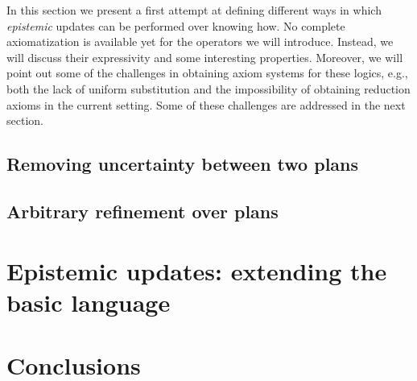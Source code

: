 \documentclass[sn-mathphys-num]{sn-jnl}%
\begin{document}
In this section we present a first attempt at defining different  
ways in which  \emph{epistemic} updates can be performed over knowing how. No complete axiomatization is
available yet for the operators we will introduce.  Instead, we will discuss their expressivity and some interesting properties.
Moreover, we will point out some of the challenges in obtaining axiom systems for these logics, e.g., both the lack of uniform substitution and the impossibility of obtaining reduction axioms in the current setting. Some of these challenges are addressed in the next section.

\subsection{Removing uncertainty between two plans}
\label{sec:ref}


\subsection{Arbitrary refinement over plans}
\label{sec:aref}


% 

\section{Epistemic updates: extending the basic language}
\label{sec:extension}







% 



% 

\section{Conclusions}
\label{sec:final}


% 


% 
\end{document}
